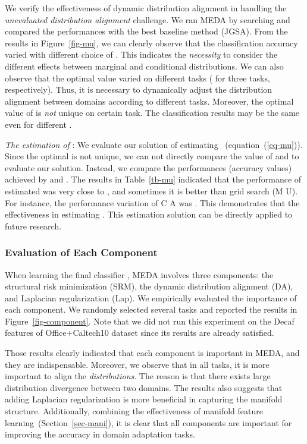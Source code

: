 \documentclass[sigconf]{acmart}
\begin{document}
We verify the effectiveness of dynamic distribution alignment in handling the \textit{unevaluated distribution alignment} challenge. We ran MEDA by searching  and compared the performances with the best baseline method (JGSA). From the results in Figure~\ref{fig-mu}, we can clearly observe that the classification accuracy varied with different choice of . This indicates the \textit{necessity} to consider the different effects between marginal and conditional distributions. We can also observe that the optimal  value varied on different tasks ( for three tasks, respectively). Thus, it is necessary to dynamically adjust the distribution alignment between domains according to different tasks. Moreover, the optimal value of  is \textit{not} unique on certain task. The classification results may be the same even for different .

\textit{The estimation of } : We evaluate our solution of estimating ~(equation~(\ref{eq-mu})). Since the optimal  is not unique, we can not directly compare the value of  and  to evaluate our solution. Instead, we compare the performances (accuracy values) achieved by  and . The results in Table~\ref{tb-mu} indicated that the performance of estimated  was very close to , and sometimes it is better than grid search (M  U). For instance, the performance variation of C  A was . This demonstrates that the effectiveness in estimating . This estimation solution can be directly applied to future research.

\subsubsection{Evaluation of Each Component} When learning the final classifier , MEDA involves three components: the structural risk minimization (SRM), the dynamic distribution alignment (DA), and Laplacian regularization (Lap). We empirically evaluated the importance of each component. We randomly selected several tasks and reported the results in Figure~\ref{fig-component}. Note that we did not run this experiment on the Decaf features of Office+Caltech10 dataset since its results are already satisfied.

Those results clearly indicated that each component is important in MEDA, and they are indispensable. Moreover, we observe that in all tasks, it is more important to align the \textit{distributions}. The reason is that there exists large distribution divergence between two domains. The results also suggests that adding Laplacian regularization is more beneficial in capturing the manifold structure. Additionally, combining the effectiveness of manifold feature learning~(Section~\ref{sec-mani}), it is clear that all components are important for improving the accuracy in domain adaptation tasks.
\end{document}
